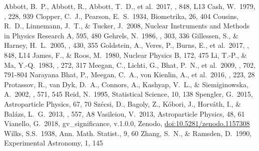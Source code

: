\documentclass[twocolumn]{aastex61}
\begin{document}
\begin{thebibliography}{dummy}
 Abbott, B.~P., Abbott, R., Abbott, T.~D., et al.\ 2017, \apjl, 848, L13 
 Cash, W.\ 1979, \apj, 228, 939
 Clopper, C.~J., Pearson, E.~S.\ 1934, Biometrika, 26, 404
 Cousins, R.~D., Linnemann, J.~T., \& Tucker, J.\ 2008, Nuclear Instruments and Methods in Physics Research A, 595, 480
 Gehrels, N.\ 1986, \apj, 303, 336 
 Gillessen, S., \& Harney, H.~L.\ 2005, \aap, 430, 355 
 Goldstein, A., Veres, P., Burns, E., et al.\ 2017, \apjl, 848, L14 
 James, F., \& Roos, M.\ 1980, Nuclear Physics B, 172, 475 
 Li, T.-P., \& Ma, Y.-Q.\ 1983, \apj, 272, 317 
 Meegan, C., Lichti, G., Bhat, P.~N., et al.\ 2009, \apj, 702, 791-804 
 Narayana Bhat, P., Meegan, C.~A., von Kienlin, A., et al.\ 2016, \apjs, 223, 28 
 Protassov, R., van Dyk, D.~A., Connors, A., Kashyap, V.~L., \& Siemiginowska, A.\ 2002, \apj, 571, 545 
 Reid, N.\ 1995, Statistical Science, 10, 138
 Spengler, G.\ 2015, Astroparticle Physics, 67, 70 
 Sz{\'e}csi, D., Bagoly, Z., K{\'o}bori, J., Horv{\'a}th, I., \& Bal{\'a}zs, L.~G.\ 2013, \aap, 557, A8 
 Vasileiou, V.\ 2013, Astroparticle Physics, 48, 61 
 Vianello, G.\ 2018, gv\_significance, v.1.0.0, Zenodo, \href{https://doi.org/10.5281/zenodo.1157308}{doi:10.5281/zenodo.1157308}
 Wilks, S.S.\ 1938, Ann. Math. Statist., 9, 60
 Zhang, S.~N., \& Ramsden, D.\ 1990, Experimental Astronomy, 1, 145 
\end{thebibliography}
\end{document}
